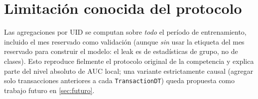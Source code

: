 \section{Limitación conocida del protocolo}

Las agregaciones por UID se computan sobre \emph{todo} el período de entrenamiento, incluido el
mes reservado como validación (aunque \emph{sin} usar la etiqueta del mes reservado para
construir el modelo: el leak es de estadísticas de grupo, no de clases). Esto reproduce
fielmente el protocolo original de la competencia y explica parte del nivel absoluto de AUC
local; una variante estrictamente causal (agregar solo transacciones anteriores a cada
\texttt{TransactionDT}) queda propuesta como trabajo futuro en \cref{sec:futuro}.
